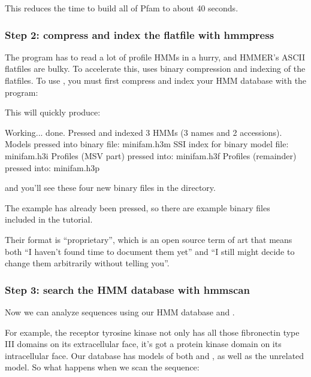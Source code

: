
This reduces the time to build all of Pfam to about 40 seconds.

\subsubsection{Step 2: compress and index the flatfile with hmmpress}

The  program has to read a lot of profile HMMs in a
hurry, and HMMER's ASCII flatfiles are bulky. To accelerate this,
 uses binary compression and indexing of the flatfiles.
To use , you must first compress and index your HMM
database with the  program:


This will quickly produce:

\begin{sreoutput}
Working...    done.
Pressed and indexed 3 HMMs (3 names and 2 accessions).
Models pressed into binary file:   minifam.h3m
SSI index for binary model file:   minifam.h3i
Profiles (MSV part) pressed into:  minifam.h3f
Profiles (remainder) pressed into: minifam.h3p
\end{sreoutput}

and you'll see these four new binary files in the directory. 

The  example has already been pressed, so there
are example binary files\\
included in the tutorial.

Their format is ``proprietary'', which is an open source term of art
that means both ``I haven't found time to document them yet'' and ``I
still might decide to change them arbitrarily without telling you''.


\subsubsection{Step 3: search the HMM database with hmmscan}

Now we can analyze sequences using our HMM database and
. 

For example, the receptor tyrosine kinase  not only
has all those fibronectin type III domains on its extracellular face,
it's got a protein kinase domain on its intracellular face. Our
 database has models of both  and
, as well as the unrelated  model. So
what happens when we scan the  sequence:

